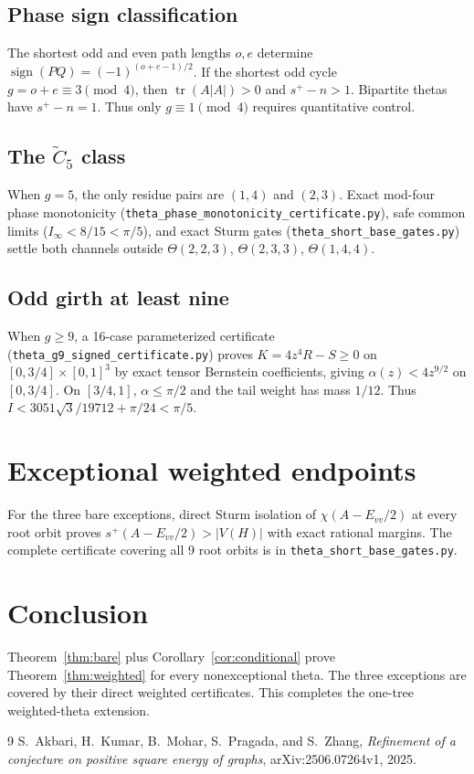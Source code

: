 \documentclass[11pt]{article}
\begin{document}
\subsection*{Phase sign classification}
The shortest odd and even path lengths $o,e$ determine
$\operatorname{sign}(PQ)=(-1)^{(o+e-1)/2}$.
If the shortest odd cycle $g=o+e\equiv3\pmod4$, then
$\operatorname{tr}(A|A|)>0$ and $s^+-n>1$.
Bipartite thetas have $s^+-n=1$.
Thus only $g\equiv1\pmod4$ requires quantitative control.

\subsection*{The $\tilde C_5$ class}
When $g=5$, the only residue pairs are $(1,4)$ and $(2,3)$.
Exact mod-four phase monotonicity (\texttt{theta\_phase\_monotonicity\_certificate.py}),
safe common limits ($I_\infty<8/15<\pi/5$), and exact Sturm gates
(\texttt{theta\_short\_base\_gates.py}) settle both channels
outside $\Theta(2,2,3)$, $\Theta(2,3,3)$, $\Theta(1,4,4)$.

\subsection*{Odd girth at least nine}
When $g\ge9$, a 16-case parameterized certificate
(\texttt{theta\_g9\_signed\_certificate.py}) proves
$K=4z^4R-S\ge0$ on $[0,3/4]\times[0,1]^3$ by exact tensor Bernstein
coefficients, giving $\alpha(z)<4z^{9/2}$ on $[0,3/4]$.
On $[3/4,1]$, $\alpha\le\pi/2$ and the tail weight has mass $1/12$.
Thus $I<3051\sqrt3/19712+\pi/24<\pi/5$.

\section{Exceptional weighted endpoints}
For the three bare exceptions, direct Sturm isolation of
$\chi(A-E_{vv}/2)$ at every root orbit proves
$s^+(A-E_{vv}/2)>|V(H)|$ with exact rational margins.
The complete certificate covering all 9 root orbits is in
\texttt{theta\_short\_base\_gates.py}.

\section{Conclusion}
Theorem~\ref{thm:bare} plus Corollary~\ref{cor:conditional} prove
Theorem~\ref{thm:weighted} for every nonexceptional theta.
The three exceptions are covered by their direct weighted certificates.
This completes the one-tree weighted-theta extension.

\begin{thebibliography}{9}
S.~Akbari, H.~Kumar, B.~Mohar, S.~Pragada, and S.~Zhang,
\emph{Refinement of a conjecture on positive square energy of graphs},
arXiv:2506.07264v1, 2025.
\end{thebibliography}
\end{document}
